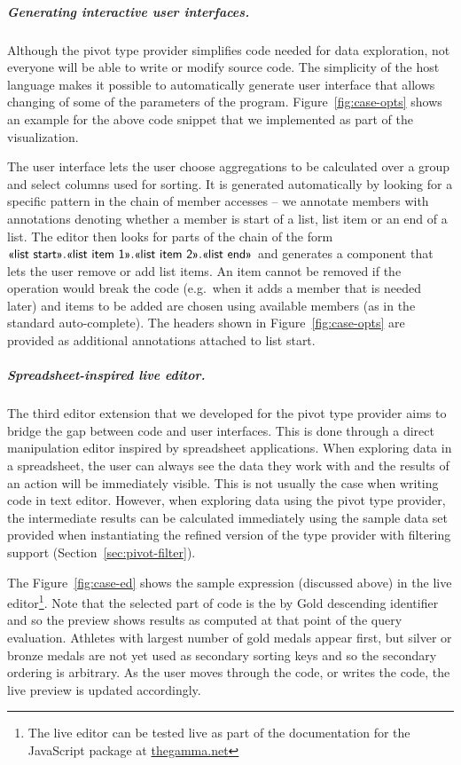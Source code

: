 \documentclass[a4paper,UKenglish]{lipics-v2016}
\theoremstyle{plain}
\theoremstyle{definition}
\newcommand{\qident}[1]{\textnormal{\sffamily \guillemotleft #1\guillemotright}}
\begin{document}

\subparagraph{Generating interactive user interfaces.}
Although the pivot type provider simplifies code needed for data exploration, not everyone will 
be able to write or modify source code. The simplicity of the host language makes it possible to  
automatically generate user interface that allows changing of some of the parameters of the program. 
Figure~\ref{fig:case-opts} shows an example for the above code snippet that we implemented as 
part of the visualization. 

The user interface lets the user choose aggregations to be calculated over a group and select 
columns used for sorting. It is generated automatically by looking for a specific pattern in the 
chain of member accesses -- we annotate members with annotations denoting whether a member is 
start of a list, list item or an end of a list. The editor then looks for parts of the chain of the
form $\qident{list start}.\qident{list item 1}.\qident{list item 2}.\qident{list end}$ and generates
a component that lets the user remove or add list items. An item cannot be removed if the operation
would break the code (e.g.~when it adds a member that is needed later) and items to be added
are chosen using available members (as in the standard auto-complete). The headers
shown in Figure~\ref{fig:case-opts} are provided as additional annotations attached to 
\qident{list start}.


\subparagraph{Spreadsheet-inspired live editor.}
The third editor extension that we developed for the pivot type provider aims to bridge the gap 
between code and user interfaces. This is done through a direct manipulation editor \cite{directman} 
inspired by spreadsheet applications. When exploring data in a spreadsheet, the user can always see the 
data they work with and the results of an action will be immediately visible. This is not usually 
the case when writing code in text editor. However, when exploring data using the pivot type 
provider, the intermediate results can be calculated immediately using the sample data set provided 
when instantiating the refined version of the type provider with filtering support (Section~\ref{sec:pivot-filter}). 

The Figure~\ref{fig:case-ed} shows the sample expression (discussed above) in the live 
editor\footnote{The live editor can be tested live as part of the documentation for the 
JavaScript package at \url{thegamma.net}}.
Note that the selected part of code is the \qident{by Gold descending} identifier and so the 
preview shows results as computed at that point of the query evaluation. Athletes with largest number
of gold medals appear first, but silver or bronze medals are not yet used as secondary sorting keys
and so the secondary ordering is arbitrary.
As the user moves through the code, or writes the code, the live preview is updated accordingly.
\end{document}
